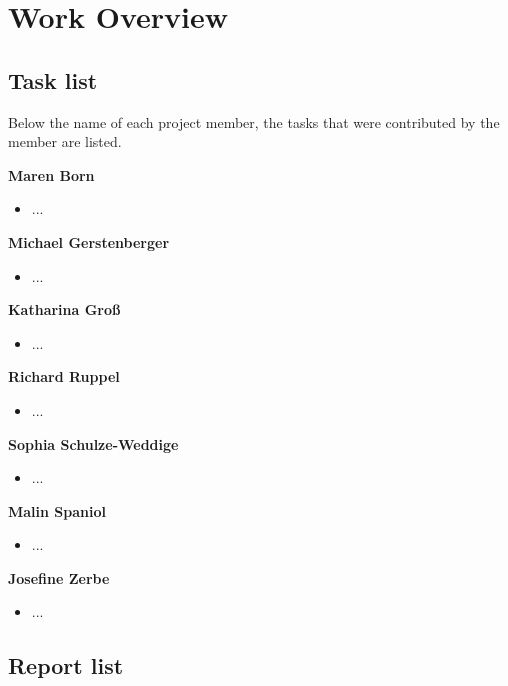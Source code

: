 
\section{Work Overview}

\subsection{Task list}

Below the name of each project member, the tasks that were contributed by the member are listed.

\bigskip
\textbf{Maren Born}
\begin{itemize}
\item ...
\end{itemize}

\textbf{Michael Gerstenberger}
\begin{itemize}
\item ...
\end{itemize}

\textbf{Katharina Groß}
\begin{itemize}
\item ...
\end{itemize}

\textbf{Richard Ruppel}
\begin{itemize}
\item ...
\end{itemize}

\textbf{Sophia Schulze-Weddige}
\begin{itemize}
\item ...
\end{itemize}

\textbf{Malin Spaniol}
\begin{itemize}
\item ...
\end{itemize}

\textbf{Josefine Zerbe}
\begin{itemize}
\item ...
\end{itemize}


\subsection{Report list}

